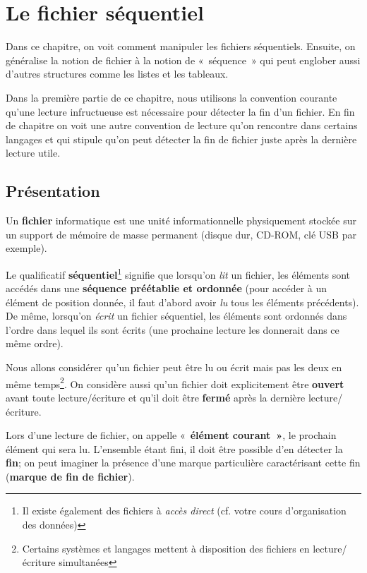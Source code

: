 \chapter{Le fichier séquentiel}



Dans ce chapitre, on voit comment manipuler les fichiers séquentiels.
Ensuite, on généralise la notion de fichier à la notion de «~séquence~»
qui peut englober aussi d'autres structures comme les
listes et les tableaux.

Dans la première partie de ce chapitre, nous utilisons la convention
courante qu'une lecture infructueuse est nécessaire
pour détecter la fin d'un fichier. En fin de chapitre
on voit une autre convention de lecture qu'on
rencontre dans certains langages et qui stipule qu'on
peut détecter la fin de fichier juste après la dernière lecture utile.

\section{Présentation}

Un \textbf{fichier} informatique est une unité informationnelle
physiquement stockée sur un support de mémoire de masse permanent
(disque dur, CD-ROM, clé USB par exemple). 


Le qualificatif \textbf{séquentiel}\footnote{Il existe également des
fichiers à \textit{accès direct} (cf. votre cours
d'organisation des données)} signifie que
lorsqu'on \textit{lit} un fichier, les éléments sont
accédés dans une \textbf{séquence préétablie et ordonnée} (pour accéder
à un élément de position donnée, il faut d’abord avoir \textit{lu} tous
les éléments précédents). De même, lorsqu'on
\textit{écrit} un fichier séquentiel, les éléments sont ordonnés dans
l'ordre dans lequel ils sont écrits (une prochaine
lecture les donnerait dans ce même ordre).

Nous allons considérer qu'un fichier peut être lu ou
écrit mais pas les deux en même temps\footnote{Certains systèmes et
langages mettent à disposition des fichiers en lecture/écriture
simultanées}. On considère aussi qu'un fichier doit
explicitement être \textbf{ouvert} avant toute lecture/écriture et
qu'il doit être \textbf{fermé} après la dernière
lecture/écriture.

Lors d'une lecture de fichier, on appelle
«~\textbf{élément courant~»}, le prochain élément qui sera lu.
L’ensemble étant fini, il doit être possible d’en détecter la
\textbf{fin}; on peut imaginer la présence d’une marque particulière
caractérisant cette fin (\textbf{marque de fin de fichier}).

